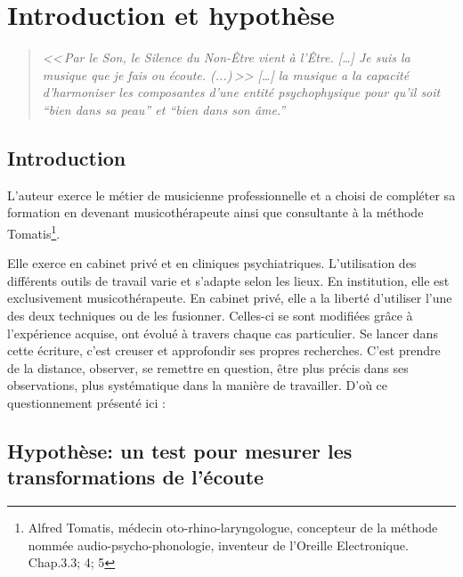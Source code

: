 \chapter{Introduction et hypothèse}
\begin{quotation}
\emph{<<\,\emph{Par le Son, le Silence du Non-Être vient à l'Être}. [\ldots] \textsl{Je suis}
\emph{la musique que je fais ou écoute}. (...)\,>>
[\ldots] \emph{la musique a la capacité d'harmoniser
les composantes d'une entité psychophysique pour qu'il soit ``bien
dans sa peau'' et ``bien dans son âme.}''}\, \autocite[ch. 1,  p. 8]{viret:b}
\end{quotation}

\section{Introduction}

L'auteur exerce le métier de musicienne professionnelle et a  choisi de compléter sa formation en devenant musicothérapeute  ainsi que consultante à la méthode Tomatis\footnote{Alfred Tomatis, médecin oto-rhino-laryngologue, concepteur de la méthode nommée audio-psycho-phonologie, inventeur de l'Oreille Electronique. Chap.3.3; 4; 5}.  



Elle exerce en cabinet privé et en cliniques psychiatriques. L'utilisation des différents outils de travail varie et s'adapte selon les lieux. En institution, elle est exclusivement musicothérapeute. En cabinet
privé, elle a la liberté d'utiliser l'une des deux techniques ou de les fusionner. Celles-ci se sont modifiées grâce à  l'expérience acquise, ont évolué  
à travers chaque cas particulier.
 Se lancer dans cette écriture, c'est creuser et approfondir ses propres recherches. C'est prendre de la distance, observer, se remettre en question, être plus précis dans ses observations, plus systématique dans la manière de travailler. D'où ce questionnement présenté ici : 


\section{Hypothèse: un test pour mesurer les trans\-for\-ma\-tions de l'écoute}


